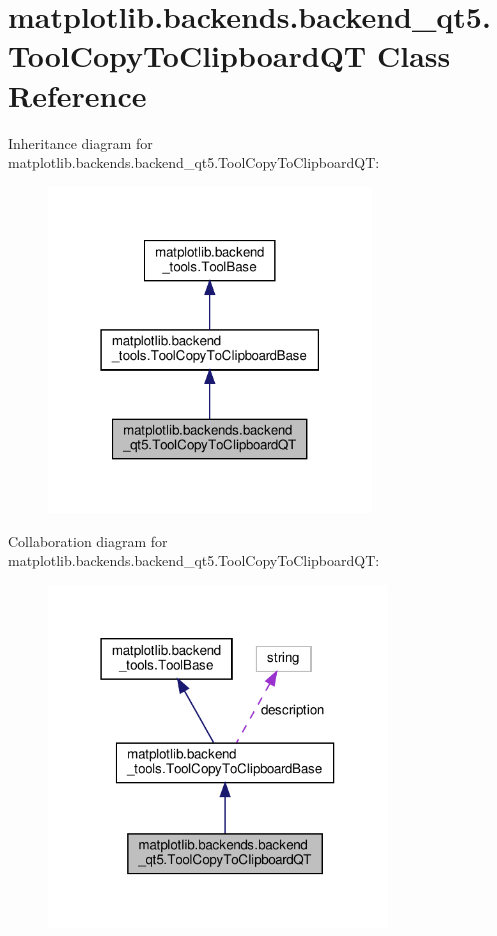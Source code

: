 \hypertarget{classmatplotlib_1_1backends_1_1backend__qt5_1_1ToolCopyToClipboardQT}{}\section{matplotlib.\+backends.\+backend\+\_\+qt5.\+Tool\+Copy\+To\+Clipboard\+QT Class Reference}
\label{classmatplotlib_1_1backends_1_1backend__qt5_1_1ToolCopyToClipboardQT}


Inheritance diagram for matplotlib.\+backends.\+backend\+\_\+qt5.\+Tool\+Copy\+To\+Clipboard\+QT\+:
\nopagebreak
\begin{figure}[H]
\begin{center}
\leavevmode
\includegraphics[width=243pt]{classmatplotlib_1_1backends_1_1backend__qt5_1_1ToolCopyToClipboardQT__inherit__graph}
\end{center}
\end{figure}


Collaboration diagram for matplotlib.\+backends.\+backend\+\_\+qt5.\+Tool\+Copy\+To\+Clipboard\+QT\+:
\nopagebreak
\begin{figure}[H]
\begin{center}
\leavevmode
\includegraphics[width=255pt]{classmatplotlib_1_1backends_1_1backend__qt5_1_1ToolCopyToClipboardQT__coll__graph}
\end{center}
\end{figure}

